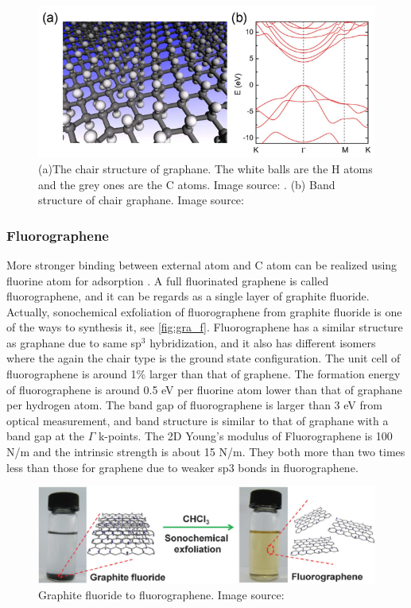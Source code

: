 \begin{figure}[htbp!] 
\centering  
\includegraphics[width=1\textwidth]{graphane.eps}
\caption[Atomic and electronic structure of graphane]{(a)The chair structure of graphane. The white balls are the H atoms and the grey ones are the C atoms. Image source: \cite{Sofo2007}. (b) Band structure of chair graphane. Image source: \cite{leenaerts2010}}  
\label{fig:gra_h}
\end{figure} 

\subsubsection{Fluorographene}

More stronger binding between external atom and C atom can be realized using fluorine atom for adsorption . A full fluorinated graphene is called fluorographene, and it can be regards as a single layer of graphite fluoride. Actually, sonochemical exfoliation of fluorographene from graphite fluoride is one of the ways to synthesis it, see \autoref{fig:gra_f}\cite{Zhu2013}. Fluorographene has a similar structure as graphane due to same sp$^3$ hybridization, and it also has different isomers where the again the chair type is the ground state configuration\cite{samarakoon2011}. The unit cell of fluorographene is around 1\% larger than that of graphene\cite{nair2010}. The formation energy of fluorographene is around 0.5 eV per fluorine atom lower than that of graphane per hydrogen atom\cite{Jeon2011}. The band gap of fluorographene is larger than 3 eV from optical measurement\cite{nair2010,Jeon2011}, and band structure is similar to that of graphane with a band gap at the $\Gamma$ k-points. The 2D Young's modulus of Fluorographene is 100 \si{N/m} and the intrinsic strength is about 15 \si{N/m}. They both more than two times less than those for graphene due to weaker sp$3$ bonds in fluorographene\cite{nair2010}.

\begin{figure}[htbp!] 
\centering  
\includegraphics[width=1\textwidth]{fluorographene.png}
\caption{Graphite fluoride to fluorographene. Image source:\cite{Zhu2013}}  
\label{fig:gra_f}
\end{figure} 

